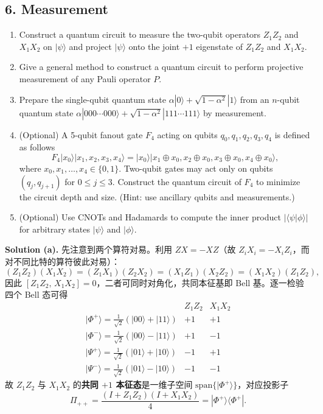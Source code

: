 \documentclass{ctexart}
\newcommand{\ket}[1]{|#1\rangle}
\newcommand{\bra}[1]{\langle #1|}
\newcommand{\braket}[1]{\langle #1\rangle}
\begin{document}
\subsection*{6. Measurement}

\begin{enumerate}
    \item[(a)] Construct a quantum circuit to measure the two-qubit operators $Z_1 Z_2$ and $X_1 X_2$ on $\ket{\psi}$ and project $\ket{\psi}$ onto the joint $+1$ eigenstate of $Z_1 Z_2$ and $X_1 X_2$.
    \item[(b)] Give a general method to construct a quantum circuit to perform projective measurement of any Pauli operator $P$.
    \item[(c)] Prepare the single-qubit quantum state $\alpha\ket{0} + \sqrt{1-\alpha^2}\ket{1}$ from an $n$-qubit quantum state $\alpha\ket{000\cdots000} + \sqrt{1-\alpha^2}\ket{111\cdots111}$ by measurement.
    \item[(d)] (Optional) A 5-qubit fanout gate $F_4$ acting on qubits $q_0, q_1, q_2, q_3, q_4$ is defined as follows
    \begin{equation*}
        F_4 \ket{x_0}\ket{x_1, x_2, x_3, x_4} = \ket{x_0}\ket{x_1 \oplus x_0, x_2 \oplus x_0, x_3 \oplus x_0, x_4 \oplus x_0},
    \end{equation*}
    where $x_0, x_1, \ldots, x_4 \in \{0,1\}$. Two-qubit gates may act only on qubits $(q_j, q_{j+1})$ for $0 \leq j \leq 3$. Construct the quantum circuit of $F_4$ to minimize the circuit depth and size. (Hint: use ancillary qubits and measurements.)
    \item[(e)] (Optional) Use CNOTs and Hadamards to compute the inner product $|\braket{\psi|\phi}|$ for arbitrary states $\ket{\psi}$ and $\ket{\phi}$.
\end{enumerate}

\medskip
\noindent\textbf{Solution (a).} 先注意到两个算符对易。利用 $ZX=-XZ$（故 $Z_iX_i=-X_iZ_i$，而对不同比特的算符彼此对易）：
\begin{equation*}
    (Z_1Z_2)(X_1X_2)=(Z_1X_1)(Z_2X_2)=(X_1Z_1)(X_2Z_2)=(X_1X_2)(Z_1Z_2),
\end{equation*}
因此 $[Z_1Z_2,\,X_1X_2]=0$，二者可同时对角化，共同本征基即 Bell 基。逐一检验四个 Bell 态可得
\begin{equation*}
\begin{array}{c|cc}
 & Z_1Z_2 & X_1X_2\\ \hline
\ket{\Phi^+}=\tfrac{1}{\sqrt2}(\ket{00}+\ket{11}) & +1 & +1\\
\ket{\Phi^-}=\tfrac{1}{\sqrt2}(\ket{00}-\ket{11}) & +1 & -1\\
\ket{\Psi^+}=\tfrac{1}{\sqrt2}(\ket{01}+\ket{10}) & -1 & +1\\
\ket{\Psi^-}=\tfrac{1}{\sqrt2}(\ket{01}-\ket{10}) & -1 & -1
\end{array}
\end{equation*}
故 $Z_1Z_2$ 与 $X_1X_2$ 的\textbf{共同 $+1$ 本征态}是一维子空间 $\mathrm{span}\{\ket{\Phi^+}\}$，对应投影子
\begin{equation*}
    \Pi_{++}=\frac{(I+Z_1Z_2)(I+X_1X_2)}{4}=\ket{\Phi^+}\!\bra{\Phi^+}.
\end{equation*}
\end{document}
